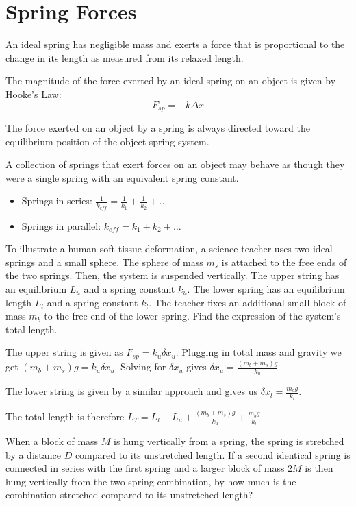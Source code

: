 \documentclass[../mech.tex]{subfiles}
\begin{document}
\section{Spring Forces}
An ideal spring has negligible mass and exerts a force that is proportional to the change in its length as measured from its relaxed length.

The magnitude of the force exerted by an ideal spring on an object is given by Hooke's Law:
\[ F_{sp}=-k\Delta x \] 

The force exerted on an object by a spring is always directed toward the equilibrium position of the object-spring system.

A collection of springs that exert forces on an object may behave as though they were a single spring with an equivalent spring constant.
\begin{itemize}
    \item Springs in series: $\frac{1}{k_{eff}}=\frac{1}{k_1}+\frac{1}{k_2}+\dots$
    \item Springs in parallel: $k_{eff}=k_1+k_2+\dots$
\end{itemize}

\begin{example}
    To illustrate a human soft tissue deformation, a science teacher uses two ideal springs and a small sphere. The sphere of mass $m_s$ is attached to the free ends of the two springs. Then, the system is 
    suspended vertically. The upper string has an equilibrium $L_u$ and a spring constant $k_u$. The lower spring has an equilibrium length $L_l$ and a spring constant $k_l$. The teacher fixes an additional small block of mass 
    $m_b$ to the free end of the lower spring. Find the expression of the system's total length.

    The upper string is given as $F_{sp}=k_u\delta x_u$. Plugging in total mass and gravity we get $(m_b+m_s)g=k_u\delta x_u$. Solving for $\delta x_u$ gives $\delta x_u = \frac{(m_b+m_s)g}{k_u}$

    The lower string is given by a similar approach and gives us $\delta x_l=\frac{m_b g}{k_l}$.

    The total length is therefore $L_T = L_l + L_u + \frac{(m_b+m_s)g}{k_u}+\frac{m_b g}{k_l}$.
\end{example}

\ex When a block of mass $M$ is hung vertically from a spring, the spring is stretched by a distance $D$ compared to its unstretched length. If a second identical spring is connected in series with the first spring and a larger 
block of mass $2M$ is then hung vertically from the two-spring combination, by how much is the combination stretched compared to its unstretched length?
\end{document}

